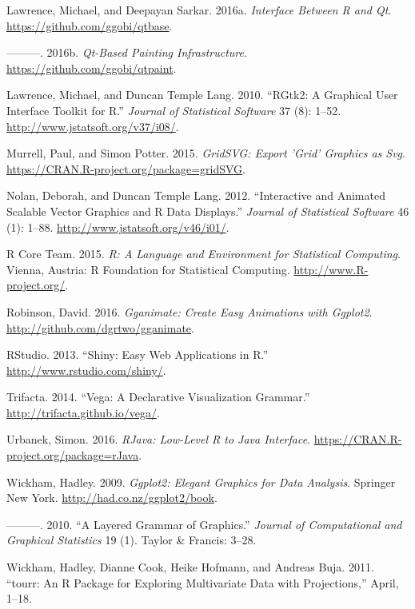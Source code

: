 \documentclass[12pt,]{article}
\theoremstyle{definition}
\theoremstyle{definition}
\theoremstyle{remark}
\begin{document}
\hypertarget{ref-qtbase}{}
Lawrence, Michael, and Deepayan Sarkar. 2016a. \emph{Interface Between R
and Qt}. \url{https://github.com/ggobi/qtbase}.

\hypertarget{ref-qtpaint}{}
---------. 2016b. \emph{Qt-Based Painting Infrastructure}.
\url{https://github.com/ggobi/qtpaint}.

\hypertarget{ref-RGtk2}{}
Lawrence, Michael, and Duncan Temple Lang. 2010. ``RGtk2: A Graphical
User Interface Toolkit for R.'' \emph{Journal of Statistical Software}
37 (8): 1--52. \url{http://www.jstatsoft.org/v37/i08/}.

\hypertarget{ref-gridSVG}{}
Murrell, Paul, and Simon Potter. 2015. \emph{GridSVG: Export 'Grid'
Graphics as Svg}. \url{https://CRAN.R-project.org/package=gridSVG}.

\hypertarget{ref-SVGAnnotation}{}
Nolan, Deborah, and Duncan Temple Lang. 2012. ``Interactive and Animated
Scalable Vector Graphics and R Data Displays.'' \emph{Journal of
Statistical Software} 46 (1): 1--88.
\url{http://www.jstatsoft.org/v46/i01/}.

\hypertarget{ref-RCore}{}
R Core Team. 2015. \emph{R: A Language and Environment for Statistical
Computing}. Vienna, Austria: R Foundation for Statistical Computing.
\url{http://www.R-project.org/}.

\hypertarget{ref-gganimate}{}
Robinson, David. 2016. \emph{Gganimate: Create Easy Animations with
Ggplot2}. \url{http://github.com/dgrtwo/gganimate}.

\hypertarget{ref-shiny}{}
RStudio. 2013. ``Shiny: Easy Web Applications in R.''
\url{http://www.rstudio.com/shiny/}.

\hypertarget{ref-vega}{}
Trifacta. 2014. ``Vega: A Declarative Visualization Grammar.''
\url{http://trifacta.github.io/vega/}.

\hypertarget{ref-rJava}{}
Urbanek, Simon. 2016. \emph{RJava: Low-Level R to Java Interface}.
\url{https://CRAN.R-project.org/package=rJava}.

\hypertarget{ref-ggplot2-book}{}
Wickham, Hadley. 2009. \emph{Ggplot2: Elegant Graphics for Data
Analysis}. Springer New York. \url{http://had.co.nz/ggplot2/book}.

\hypertarget{ref-ggplot2-paper}{}
---------. 2010. ``A Layered Grammar of Graphics.'' \emph{Journal of
Computational and Graphical Statistics} 19 (1). Taylor \& Francis:
3--28.

\hypertarget{ref-tourr}{}
Wickham, Hadley, Dianne Cook, Heike Hofmann, and Andreas Buja. 2011.
``tourr: An R Package for Exploring Multivariate Data with
Projections,'' April, 1--18.
\end{document}
